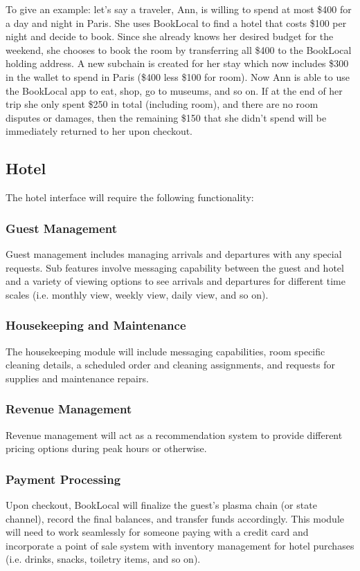 \documentclass{article}
\begin{document}
\begin{flushleft}
To give an example: let's say a traveler, Ann, is willing to spend at most \$400 for a day and night in Paris. She uses BookLocal to find a hotel that costs \$100 per night and decide to book. Since she already knows her desired budget for the weekend, she chooses to book the room by transferring all \$400 to the BookLocal holding address. A new subchain is created for her stay which now includes \$300 in the wallet to spend in Paris (\$400 less \$100 for room). Now Ann is able to use the BookLocal app to eat, shop, go to museums, and so on. If at the end of her trip she only spent \$250 in total (including room), and there are no room disputes or damages, then the remaining \$150 that she didn't spend will be immediately returned to her upon checkout.
\end{flushleft}

\subsection{Hotel}
The hotel interface will require the following functionality:  

\subsubsection{Guest Management}
Guest management includes managing arrivals and departures with any special requests. Sub features involve messaging capability between the guest and hotel and a variety of viewing options to see arrivals and departures for different time scales (i.e. monthly view, weekly view, daily view, and so on).

\subsubsection{Housekeeping and Maintenance}
The housekeeping module will include messaging capabilities, room specific cleaning details, a scheduled order and cleaning assignments, and requests for supplies and maintenance repairs.

\subsubsection{Revenue Management}
Revenue management will act as a recommendation system to provide different pricing options during peak hours or otherwise. 

\subsubsection{Payment Processing}
Upon checkout, BookLocal will finalize the guest's plasma chain (or state channel), record the final balances, and transfer funds accordingly. This module will need to work seamlessly for someone paying with a credit card and incorporate a point of sale system with inventory management for hotel purchases (i.e. drinks, snacks, toiletry items, and so on).
\end{document}
